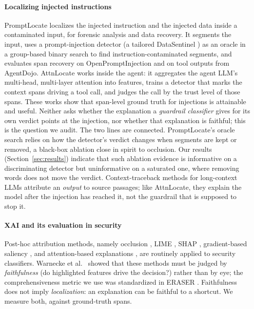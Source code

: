 \documentclass{ieeeaccess}
\begin{document}
\paragraph*{Localizing injected instructions}
PromptLocate \cite{promptlocate2026} localizes the injected instruction and the injected data inside a contaminated input, for forensic analysis and data recovery. It segments the input, uses a prompt-injection detector (a tailored DataSentinel \cite{datasentinel2025}) as an oracle in a group-based binary search to find instruction-contaminated segments, and evaluates span recovery on OpenPromptInjection and on tool outputs from AgentDojo. AttnLocate \cite{attnlocate2026} works inside the agent: it aggregates the agent LLM's multi-head, multi-layer attention into features, trains a detector that marks the context spans driving a tool call, and judges the call by the trust level of those spans. These works show that span-level ground truth for injections is attainable and useful. Neither asks whether the explanation a \emph{guardrail classifier} gives for its own verdict points at the injection, nor whether that explanation is faithful; this is the question we audit. The two lines are connected. PromptLocate's oracle search relies on how the detector's verdict changes when segments are kept or removed, a black-box ablation close in spirit to occlusion. Our results (Section~\ref{sec:results}) indicate that such ablation evidence is informative on a discriminating detector but uninformative on a saturated one, where removing words does not move the verdict. Context-traceback methods for long-context LLMs \cite{tracllm2025,attntrace2025} attribute an \emph{output} to source passages; like AttnLocate, they explain the model after the injection has reached it, not the guardrail that is supposed to stop it.

\paragraph*{XAI and its evaluation in security}
Post-hoc attribution methods, namely occlusion \cite{zeiler2014}, LIME \cite{lime2016}, SHAP \cite{shap2017}, gradient-based saliency \cite{sundararajan2017}, and attention-based explanations \cite{attention2017}, are routinely applied to security classifiers. Warnecke et al.\ \cite{warnecke2020} showed that these methods must be judged by \emph{faithfulness} (do highlighted features drive the decision?) rather than by eye; the comprehensiveness metric we use was standardized in ERASER \cite{deyoung2020}. Faithfulness does not imply \emph{localization}: an explanation can be faithful to a shortcut. We measure both, against ground-truth spans.
\end{document}
